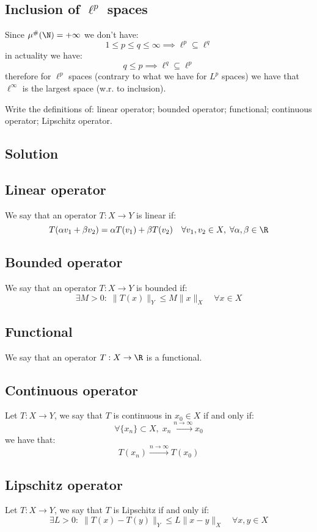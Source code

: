 \subsection{Inclusion of \texorpdfstring{$\ell^p$}{lp} spaces}
Since $\mu^\#(\N)=+\infty$ we don't have:
\[ 1 \leq p \leq q \leq \infty  \implies \ell^p \subseteq \ell^q \]
in actuality we have:
\[ q \leq p \implies \ell^q \subseteq \ell^p \]
therefore for $\ell^p$ spaces (contrary to what we have for $L^p$ spaces) we have that $\ell^\infty$ is the largest space (w.r. to inclusion).


\question
Write the definitions of: linear operator; bounded operator; functional; continuous operator; Lipschitz operator.

\subsection*{Solution}

\subsection{Linear operator}
We say that an operator $T:X\to Y$ is linear if:
\[ T(\alpha v_1 + \beta v_2) = \alpha T(v_1) + \beta T(v_2) \quad \forall v_1, v_2 \in X, \; \forall \alpha, \beta \in \R \]

\subsection{Bounded operator}
We say that an operator $T:X\to Y$ is bounded if:
\[ \exists M > 0: \; \|T(x)\|_Y \leq M \|x\|_X \quad \forall x \in X \]

\subsection{Functional}
We say that an operator $T:X\to \R$ is a functional.

\subsection{Continuous operator}
Let $T:X\to Y$, we say that $T$ is continuous in $x_0 \in X$ if and only if:
\[ \forall \{x_n\} \subset X,\; x_n \xrightarrow{n\to\infty} x_0 \]
we have that:
\[ T(x_n) \xrightarrow{n\to\infty} T(x_0) \]

\subsection{Lipschitz operator}
Let $T:X\to Y$, we say that $T$ is Lipschitz if and only if:
\[ \exists L>0 : \; \|T(x) - T(y)\|_Y \leq L\|x-y\|_X \quad \forall x,y \in X \]


